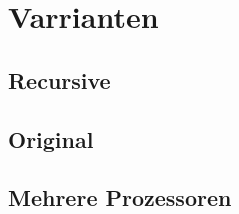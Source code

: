 \section{Varrianten}

\subsection{Recursive}

\subsection{Original}

\subsection{Mehrere Prozessoren}

